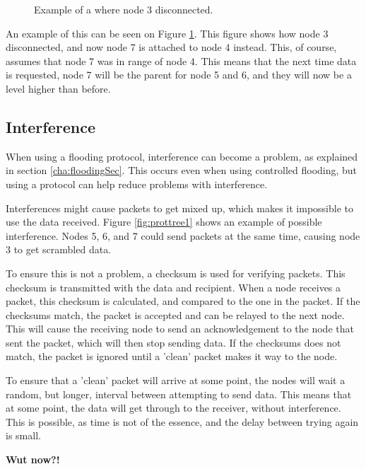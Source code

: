 \begin{figure}[!h]
	\centering
	\caption{Example of a where node 3 disconnected.}
	\label{fig:prottree2}
\end{figure}

An example of this can be seen on Figure \ref{fig:prottree2}. This figure shows how node 3 disconnected, and now node 7 is attached to node 4 instead. This, of course, assumes that node 7 was in range of node 4.
This means that the next time data is requested, node 7 will be the parent for node 5 and 6, and they will now be a level higher than before.

\subsection*{Interference}
When using a flooding protocol, interference can become a problem, as explained in section \ref{cha:floodingSec}. This occurs even when using controlled flooding, but using a protocol can help reduce problems with interference.

Interferences might cause packets to get mixed up, which makes it impossible to use the data received. Figure \ref{fig:prottree1} shows an example of possible interference. Nodes 5, 6, and 7 could send packets at the same time, causing node 3 to get scrambled data.

To ensure this is not a problem, a checksum is used for verifying packets. This checksum is transmitted with the data and recipient. When a node receives a packet, this checksum is calculated, and compared to the one in the packet. If the checksums match, the packet is accepted and can be relayed to the next node. This will cause the receiving node to send an acknowledgement to the node that sent the packet, which will then stop sending data.
If the checksums does not match, the packet is ignored until a 'clean' packet makes it way to the node.

To ensure that a 'clean' packet will arrive at some point, the nodes will wait a random, but longer, interval between attempting to send data. This means that at some point, the data will get through to the receiver, without interference.
This is possible, as time is not of the essence, and the delay between trying again is small.

\textbf{Wut now?!}
